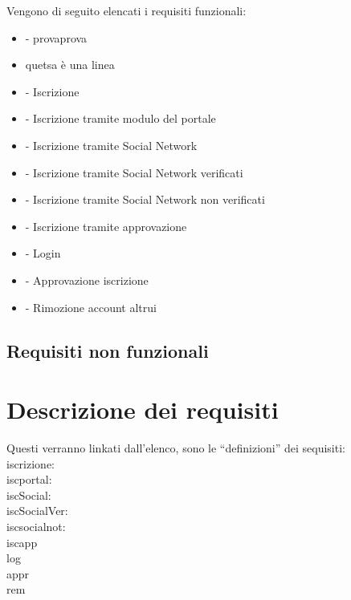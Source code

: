 \label{sub:requisiti_funzionali}
Vengono di seguito elencati i requisiti funzionali:
\begin{itemize} 
	\item {} - provaprova
	\item quetsa è una linea
	\item {} - Iscrizione
	\item {} - Iscrizione tramite modulo del portale 
	\item {} - Iscrizione tramite Social Network
	\item {} - Iscrizione tramite Social Network verificati
	\item {} - Iscrizione tramite Social Network non verificati
	\item {} - Iscrizione tramite approvazione
	\item {} - Login 
	\countReset 
	\item {} - Approvazione iscrizione
	\item {} - Rimozione account altrui 
	\countReset

\end{itemize}	


\subsection{Requisiti non funzionali}
\label{sub:requisiti_non_funzionali}


\section{Descrizione dei requisiti}
\label{sec:descrizione_dei_requisiti}
Questi verranno linkati dall'elenco, sono le ``definizioni'' dei sequisiti:\\
iscrizione:   \\
iscportal:   \\
iscSocial:   \\
iscSocialVer:   \\
iscsocialnot:   \\
iscapp  \\
log  \\
appr  \\
rem  \\

